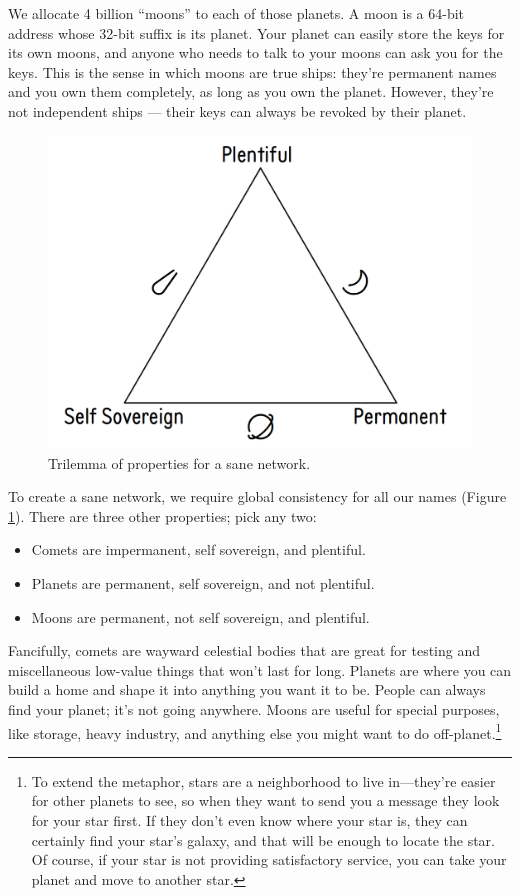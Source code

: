 \documentclass[twoside]{article}
\begin{document}
We allocate 4 billion ``moons'' to each of those planets. A moon is a
64-bit address whose 32-bit suffix is its planet. Your planet can easily
store the keys for its own moons, and anyone who needs to talk to your
moons can ask you for the keys.
This is the sense in which moons are true ships: they're permanent names
and you own them completely, as long as you own the planet. However,
they're not independent ships --- their keys can always be revoked by
their planet.

\begin{figure}[htb]
  \includegraphics[width=\textwidth]{img/trilemma}
  \caption{Trilemma of properties for a sane network.}
  \label{fig:trilemma}
\end{figure}
  
To create a sane network, we require global consistency for all our
names (Figure \ref{fig:trilemma}). There are three other properties; pick any two:

\begin{itemize}
\item
  Comets are impermanent, self sovereign, and plentiful.
\item
  Planets are permanent, self sovereign, and not plentiful.
\item
  Moons are permanent, not self sovereign, and plentiful.
\end{itemize}

Fancifully, comets are wayward celestial bodies that are great for
testing and miscellaneous low-value things that won't last for long.
Planets are where you can build a home and shape it into anything you
want it to be. People can always find your planet; it's not going
anywhere. Moons are useful for special purposes, like storage, heavy
industry, and anything else you might want to do
off-planet.\footnote{To extend the metaphor, stars are a neighborhood to live in—they're
easier for other planets to see, so when they want to send you a
message they look for your star first. If they don't even know where
your star is, they can certainly find your star's galaxy, and that
will be enough to locate the star. Of course, if your star is not
providing satisfactory service, you can take your planet and move to
another star.} \tombstone{}

\printbibliography
\end{document}
